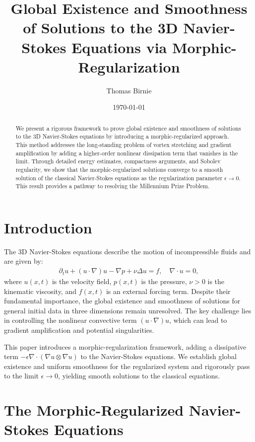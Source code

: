 \documentclass[12pt]{article}
\title{Global Existence and Smoothness of Solutions to the 3D Navier-Stokes Equations via Morphic-Regularization}
\author{Thomas Birnie}
\date{\today}
\begin{document}
\maketitle

\begin{abstract}
We present a rigorous framework to prove global existence and smoothness of solutions to the 3D Navier-Stokes equations by introducing a morphic-regularized approach. This method addresses the long-standing problem of vortex stretching and gradient amplification by adding a higher-order nonlinear dissipation term that vanishes in the limit. Through detailed energy estimates, compactness arguments, and Sobolev regularity, we show that the morphic-regularized solutions converge to a smooth solution of the classical Navier-Stokes equations as the regularization parameter $\epsilon \to 0$. This result provides a pathway to resolving the Millennium Prize Problem.
\end{abstract}

\section{Introduction}

The 3D Navier-Stokes equations describe the motion of incompressible fluids and are given by:
\begin{align}
\partial_t u + (u \cdot \nabla) u - \nabla p + \nu \Delta u = f, \quad \nabla \cdot u = 0,
\end{align}
where $u(x,t)$ is the velocity field, $p(x,t)$ is the pressure, $\nu > 0$ is the kinematic viscosity, and $f(x,t)$ is an external forcing term. Despite their fundamental importance, the global existence and smoothness of solutions for general initial data in three dimensions remain unresolved. The key challenge lies in controlling the nonlinear convective term $(u \cdot \nabla) u$, which can lead to gradient amplification and potential singularities.

This paper introduces a morphic-regularization framework, adding a dissipative term $-\epsilon \nabla \cdot (\nabla u \otimes \nabla u)$ to the Navier-Stokes equations. We establish global existence and uniform smoothness for the regularized system and rigorously pass to the limit $\epsilon \to 0$, yielding smooth solutions to the classical equations.

\section{The Morphic-Regularized Navier-Stokes Equations}
\end{document}
